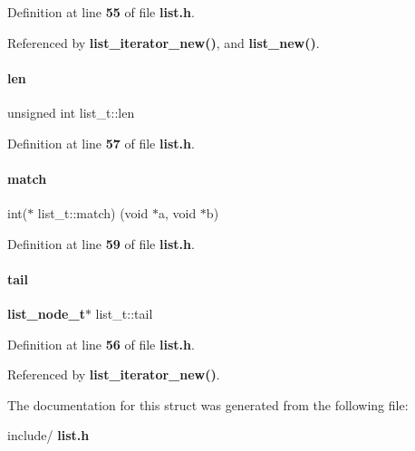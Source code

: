 Definition at line \textbf{ 55} of file \textbf{ list.\+h}.



Referenced by \textbf{ list\+\_\+iterator\+\_\+new()}, and \textbf{ list\+\_\+new()}.

\mbox{\label{a00171_aba275113a143fe39c162f547c6792502}} 
\paragraph{len}
{\footnotesize\ttfamily unsigned int list\+\_\+t\+::len}



Definition at line \textbf{ 57} of file \textbf{ list.\+h}.

\mbox{\label{a00171_a3cf6cc60206869f52386f1f72e161839}} 
\paragraph{match}
{\footnotesize\ttfamily int($\ast$ list\+\_\+t\+::match) (void $\ast$a, void $\ast$b)}



Definition at line \textbf{ 59} of file \textbf{ list.\+h}.

\mbox{\label{a00171_a45dc80e38f8869f66e5d006117aae5f2}} 
\paragraph{tail}
{\footnotesize\ttfamily \textbf{ list\+\_\+node\+\_\+t}$\ast$ list\+\_\+t\+::tail}



Definition at line \textbf{ 56} of file \textbf{ list.\+h}.



Referenced by \textbf{ list\+\_\+iterator\+\_\+new()}.



The documentation for this struct was generated from the following file\+:\begin{DoxyCompactItemize}
\item 
include/\textbf{ list.\+h}\end{DoxyCompactItemize}
